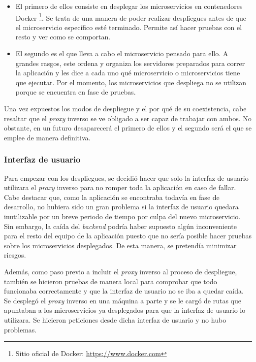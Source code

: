 \documentclass[11pt,spanish,listoffigures]{tfgetsinf}
\begin{document}
\begin{itemize}

	\item El primero de ellos consiste en desplegar los microservicios en contenedores Docker \footnote{Sitio oficial de Docker: \url{https://www.docker.com}}. Se trata de una manera de poder realizar despliegues antes de que el microservicio específico esté terminado. Permite así hacer pruebas con el resto y ver como se comportan.

	\item El segundo es el que lleva a cabo el microservicio pensado para ello. A grandes rasgos, este ordena y organiza los servidores preparados para correr la aplicación y les dice a cada uno qué microservicio o microservicios tiene que ejecutar. Por el momento, los microservicios que despliega no se utilizan porque se encuentra en fase de pruebas.

\end{itemize}

Una vez expuestos los modos de despliegue y el por qué de su coexistencia, cabe resaltar que el \emph{proxy} inverso se ve obligado a ser capaz de trabajar con ambos. No obstante, en un futuro desaparecerá el primero de ellos y el segundo será el que se emplee de manera definitiva.


			\subsubsection{Interfaz de usuario}

Para empezar con los despliegues, se decidió hacer que solo la interfaz de usuario utilizara el \emph{proxy} inverso para no romper toda la aplicación en caso de fallar. Cabe destacar que, como la aplicación se encontraba todavía en fase de desarrollo, no hubiera sido un gran problema si la interfaz de usuario quedara inutilizable por un breve periodo de tiempo por culpa del nuevo microservicio. Sin embargo, la caída del \emph{backend} podría haber supuesto algún inconveniente para el resto del equipo de la aplicación puesto que no sería posible hacer pruebas sobre los microservicios desplegados. De esta manera, se pretendía minimizar riesgos.

Además, como paso previo a incluir el \emph{proxy} inverso al proceso de despliegue, también se hicieron pruebas de manera local para comprobar que todo funcionaba correctamente y que la interfaz de usuario no se iba a quedar caída. Se desplegó el \emph{proxy} inverso en una máquina a parte y se le cargó de rutas que apuntaban a los microservicios ya desplegados para que la interfaz de usuario lo utilizara. Se hicieron peticiones desde dicha interfaz de usuario y no hubo problemas.
\end{document}
